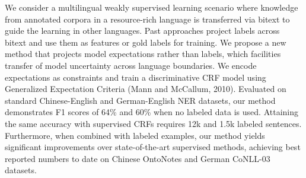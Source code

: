 We consider a multilingual weakly supervised learning scenario where knowledge from annotated corpora in a resource-rich language is transferred via bitext to guide the learning in other languages. Past approaches project labels across bitext and use them as features or gold labels for training. We propose a new method that projects model expectations rather than labels, which facilities transfer of model uncertainty across language boundaries. We encode expectations as constraints and train a discriminative CRF model using Generalized Expectation Criteria (Mann and McCallum, 2010). Evaluated on standard Chinese-English and German-English NER datasets, our method demonstrates F1 scores of 64\% and 60\% when no labeled data is used. Attaining the same accuracy with supervised CRFs requires 12k and 1.5k labeled sentences. Furthermore, when combined with labeled examples, our method yields significant improvements over state-of-the-art supervised methods, achieving best reported numbers to date on Chinese OntoNotes and German CoNLL-03 datasets.
